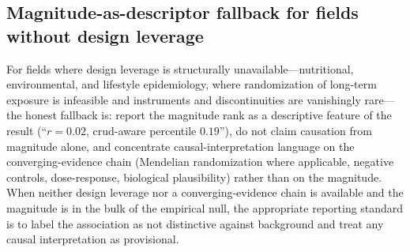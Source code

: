 \subsection{Magnitude-as-descriptor fallback for fields without design leverage}
\label{si:fallback-advice}

For fields where design leverage is structurally unavailable---nutritional, environmental, and lifestyle epidemiology, where randomization of long-term exposure is infeasible and instruments and discontinuities are vanishingly rare---the honest fallback is: report the magnitude rank as a descriptive feature of the result (``$r=0.02$, crud-aware percentile $0.19$''), do not claim causation from magnitude alone, and concentrate causal-interpretation language on the converging-evidence chain (Mendelian randomization where applicable, negative controls, dose-response, biological plausibility) rather than on the magnitude. When neither design leverage nor a converging-evidence chain is available and the magnitude is in the bulk of the empirical null, the appropriate reporting standard is to label the association as not distinctive against background and treat any causal interpretation as provisional.
